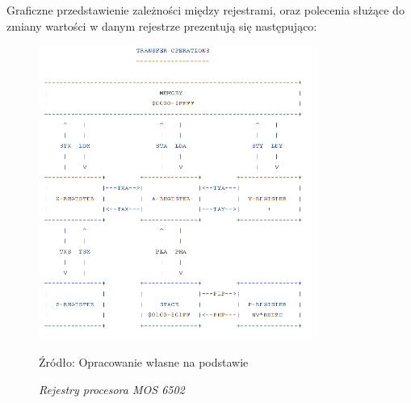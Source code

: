 Graficzne przedstawienie zależności między rejestrami, oraz polecenia służące do zmiany wartości w danym rejestrze prezentują się następująco:
\begin{figure}[h]
    \centering
    \includegraphics[width=0.8\textwidth]{images/Transfer_Operations.png} %
    \caption{ \textit{Rejestry procesora MOS 6502}}
    \label{fig:Transfer_Opertaions} 
    \vspace{0.5em} %
    \footnotesize Źródło: Opracowanie własne na podstawie \parencite{sander_cederlof_6502}
\end{figure}

\endgroup
